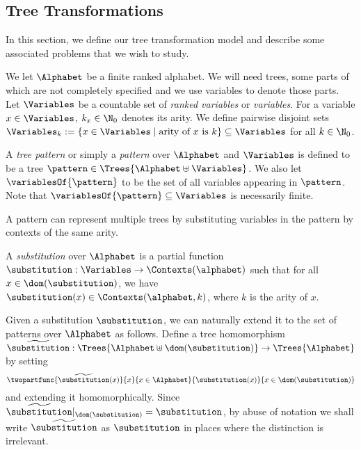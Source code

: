 \subsection{Tree Transformations}\label{subsec:model}

In this section, we define our tree transformation model and describe some associated problems that we wish to study. 

We let $\Alphabet$ be a finite ranked alphabet. We will need trees, some parts of which are not completely specified and we use variables to denote those parts. Let $\Variables$ be a countable set of \emph{ranked variables} or \emph{variables}. For a variable $x \in \Variables$, $k_x \in \N_0$ denotes its arity. We define pairwise disjoint sets $\Variables_k := \{x \in \Variables \mid \mbox{arity of $x$ is $k$}\} \subseteq \Variables$ for all $k \in \N_0$.

\begin{definition}[Pattern]\label{def:pattern}
    A \emph{tree pattern} or simply a \emph{pattern} over $\Alphabet$ and $\Variables$ is defined to be a tree $\pattern \in \Trees{\Alphabet \uplus \Variables}$. We also let \emph{$\variablesOf{\pattern}$} to be the set of all variables appearing in $\pattern$. Note that $\variablesOf{\pattern} \subseteq \Variables$ is necessarily finite.
\end{definition}

A pattern can represent multiple trees by substituting variables  in the pattern by contexts of the same arity.
\begin{definition}[Substitution]\label{def:substitution}
    A \emph{substitution} over $\Alphabet$ is a partial function $\substitution : \Variables \to \Contexts(\alphabet)$ such that for all $x \in \dom(\substitution)$, we have $\substitution(x) \in \Contexts(\alphabet, k)$, where $k$ is the arity of $x$.
\end{definition}

Given a substitution $\substitution$, we can naturally extend it to the set of patterns over $\Alphabet$ as follows. Define a tree homomorphism $\widetilde{\substitution} : \Trees{\Alphabet \uplus \dom(\substitution)} \to \Trees{\Alphabet}$ by setting
\[\twopartfunc{\widetilde{\substitution}(x)}{x}{x \in \Alphabet}{\substitution(x)}{x \in \dom(\substitution)}\]
and extending it homomorphically. Since $\widetilde{\substitution}|_{\dom(\substitution)} = \substitution$, by abuse of notation we shall write $\widetilde{\substitution}$ as $\substitution$ in places where the distinction is irrelevant.

